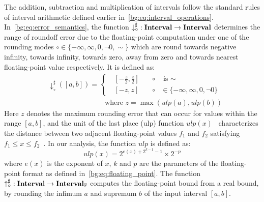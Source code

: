 The addition, subtraction and multiplication of intervals follow the standard
rules of interval arithmetic defined earlier in~\eqref{bg:eq:interval_operations}.
In~\eqref{bg:eq:error_semantics}, the function $\operatorname{\downarrow^\sharp_\circ}: \mathbf{Interval} \to
\mathbf{Interval}$ determines the range of roundoff error due to the floating-point
computation under one of the rounding modes $\circ \in \{ -\infty, \infty, 0,
\neg0, \sim \}$ which are round towards negative infinity, towards infinity,
towards zero, away from zero and towards nearest floating-point value
respectively. It is defined as:
\begin{equation}
    \begin{aligned}
        & \downarrow^\sharp_\circ([a, b]) = \left\{
            \begin{aligned}
                & \left[ -\frac{z}{2}, \frac{z}{2}\right]
                    & \quad \circ & \text{~is~}\sim \\
                & \left[ -z, z\right]
                    & \quad \circ & \in \{ -\infty, \infty, 0, \neg0 \}
            \end{aligned}
        \right. \\
        & \qquad\qquad\qquad\qquad \text{where~} z = \max(ulp(a), ulp(b))
    \end{aligned}
\end{equation}
Here $z$ denotes the maximum rounding error that can occur for values
within the range $[a, b]$, and the unit of the last place (ulp) function
$ulp(x)$~\cite{muller} characterizes the distance between two adjacent
floating-point values $f_1$ and $f_2$ satisfying $f_1 \leq x \leq
f_2$~\cite{goldberg}. In our analysis, the function $ulp$ is defined as:
\begin{equation}
    ulp(x) = 2^{e(x) + 2^{k - 1} - 1} \times 2^{-p}
\end{equation}
where $e(x)$ is the exponent of $x$, $k$ and $p$ are the parameters of the
floating-point format as defined in~\eqref{bg:eq:floating_point}. The function
$\operatorname{\uparrow^\sharp_\circ}: \mathbf{Interval} \to \mathbf{Interval}_\mathbb{F}$ computes the floating-point
bound from a real bound, by rounding the infimum $a$ and supremum $b$ of the
input interval $[a, b]$.

